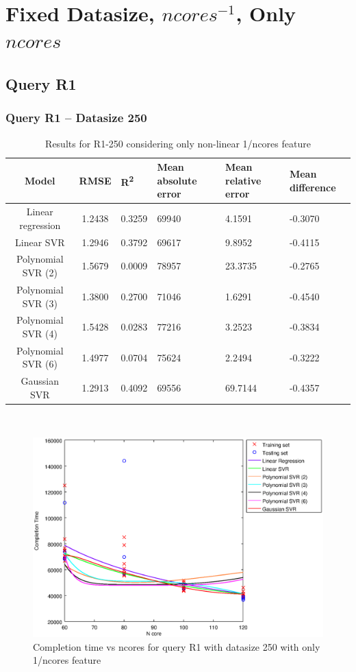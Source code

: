 \documentclass[a4paper,11pt]{article}
\begin{document}

\newpage
\section{Fixed Datasize, $ncores^{-1}$, Only $ncores$}
\subsection{Query R1}
\subsubsection{Query R1 -- Datasize 250}
\begin{table}[H]
	\centering
	\begin{adjustbox}{center}
		\begin{tabular}{c | c M{1.2cm} M{2.5cm} M{2.5cm} M{1.8cm}}
			Model & RMSE & R\textsuperscript{2} & Mean absolute error & Mean relative error & Mean difference \tabularnewline
			\hline
			Linear regression & 1.2438 & 0.3259 &  69940 & 4.1591 & -0.3070 \\
			Linear SVR & 1.2946 & 0.3792 &  69617 & 9.8952 & -0.4115 \\
			Polynomial SVR (2) & 1.5679 & 0.0009 &  78957 & 23.3735 & -0.2765 \\
			Polynomial SVR (3) & 1.3800 & 0.2700 &  71046 & 1.6291 & -0.4540 \\
			Polynomial SVR (4) & 1.5428 & 0.0283 &  77216 & 3.2523 & -0.3834 \\
			Polynomial SVR (6) & 1.4977 & 0.0704 &  75624 & 2.2494 & -0.3222 \\
			Gaussian SVR & 1.2913 & 0.4092 &  69556 & 69.7144 & -0.4357 \\
		\end{tabular}
	\end{adjustbox}
	\\
	\caption{Results for R1-250 considering only non-linear 1/ncores feature}
	\label{table_R1_prediction_all}
\end{table}

\begin {figure}[hbtp]
\centering
\includegraphics[width=\textwidth]{output/R1_250_ONLY_1_OVER_NCORES/plot_R1_250.eps}
\caption {Completion time vs ncores for query R1 with datasize 250 with only 1/ncores feature}
\end {figure}
\end{document}

